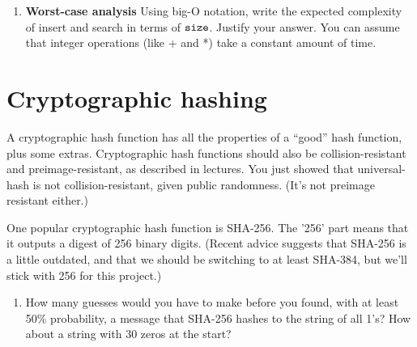 \documentclass[11pt]{article}
\newcommand{\size}{{\tt size}}
\begin{document}
\begin{enumerate}[resume]
\item {\bf Worst-case analysis}
    Using big-O notation, write the expected complexity of insert and search in terms of $\size$.
        Justify your answer.
        You can assume that integer operations (like + and *) take a constant amount of time.
\end{enumerate}

\section*{Cryptographic hashing}
A cryptographic hash function has all the properties of a ``good'' hash function, plus some extras.
Cryptographic hash functions should also be collision-resistant and preimage-resistant,
as described in lectures.
You just showed that  universal-hash is not collision-resistant, given public randomness.
(It's not preimage resistant either.)

One popular cryptographic hash function is SHA-256.
The '256' part means that it outputs a digest of 256 binary digits.
(Recent advice suggests that SHA-256 is a little outdated,
and that we should be switching to at least SHA-384,
but we'll stick with 256 for this project.)

\begin{enumerate}[resume]
\item How many guesses would you have to make before you found, with at least
    50\% probability, a message that SHA-256 hashes to the string of all 1's?
        How about a string with 30 zeros at the start?
\end{enumerate}
\end{document}
